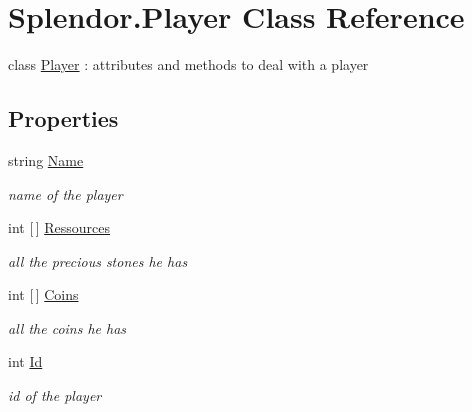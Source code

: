 \hypertarget{class_splendor_1_1_player}{}\section{Splendor.\+Player Class Reference}
\label{class_splendor_1_1_player}


class \hyperlink{class_splendor_1_1_player}{Player} \+: attributes and methods to deal with a player  


\subsection*{Properties}
\begin{DoxyCompactItemize}
\item 
string \hyperlink{class_splendor_1_1_player_a15abd489e523e11b6beb4b186783e47f}{Name}
\begin{DoxyCompactList}\small\item\em name of the player \end{DoxyCompactList}\item 
int \mbox{[}$\,$\mbox{]} \hyperlink{class_splendor_1_1_player_a1c5ccd2470e3bbc84e9a156bc323bfd0}{Ressources}
\begin{DoxyCompactList}\small\item\em all the precious stones he has \end{DoxyCompactList}\item 
int \mbox{[}$\,$\mbox{]} \hyperlink{class_splendor_1_1_player_a729fa09f28e378e7934f3ae54ea463e9}{Coins}
\begin{DoxyCompactList}\small\item\em all the coins he has \end{DoxyCompactList}\item 
int \hyperlink{class_splendor_1_1_player_a5616e3562be3e8800f9e959e7cf75194}{Id}
\begin{DoxyCompactList}\small\item\em id of the player \end{DoxyCompactList}\end{DoxyCompactItemize}


